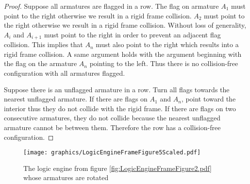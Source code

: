 \begin{proof}

Suppose all armatures are flagged in a row.  The flag on armature $A_1$ must point to the 
right otherwise we result in a rigid frame collision.  $A_2$ must point to the right otherwise 
we result in a rigid frame collision.  Without loss of generality, $A_i$ and $A_{i+1}$ must 
point to the right in order to prevent an adjacent flag collision.  This implies that $A_n$ 
must also point to the right which results into a rigid frame collision.
A same argument holds with the argument beginning with the flag 
on the armature $A_n$ pointing to the left.  Thus there is no collision-free configuration with 
all 
armatures flagged.


Suppose there is an unflagged armature in a row.  Turn all flags towards the nearest unflagged 
armature.  If there are flags on $A_1$ and $A_n$, point toward the interior thus they do not 
collide with the rigid frame.  If there are flags on two consecutive armatures, they do not collide 
because the nearest unflagged armature cannot be between them.  Therefore the row has a 
collision-free configuration.
\end{proof}

\begin{figure}[!htbp]
\begin{center}
\texttt{[image: graphics/LogicEngineFrameFigure5Scaled.pdf]}
\caption{The logic engine from figure \ref{fig:LogicEngineFrameFigure2.pdf} whose armatures are rotated}\label{fig:LogicEngineFrameFigure5.pdf}
\end{center}
\end{figure}


